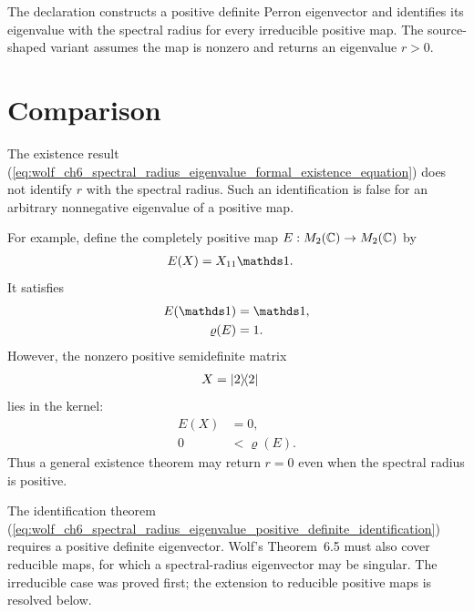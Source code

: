 \documentclass{article}
\begin{document}
The declaration
 constructs a positive
definite Perron eigenvector and identifies its eigenvalue with the spectral
radius for every irreducible positive map. The source-shaped variant
 assumes the
map is nonzero and returns an eigenvalue $r>0$.

\section{Comparison}

The existence result
(\ref{eq:wolf_ch6_spectral_radius_eigenvalue_formal_existence_equation}) does
not identify $r$ with the spectral radius. Such an identification is false
for an arbitrary nonnegative eigenvalue of a positive map.

For example, define the completely positive map $E:M_{2}(\mathbb{C})\to M_{2}(\mathbb{C})$ by
\begin{align}
    E(X)
        &=X_{11}\one.
    \label{eq:wolf_ch6_spectral_radius_eigenvalue_counterexample_map}
\end{align}
It satisfies
\begin{align}
    E(\one)
        &=\one,
    \label{eq:wolf_ch6_spectral_radius_eigenvalue_counterexample_unit_eigenvector}\\
    \varrho(E)
        &=1.
    \label{eq:wolf_ch6_spectral_radius_eigenvalue_counterexample_spectral_radius}
\end{align}
However, the nonzero positive semidefinite matrix
\begin{align}
    X
        &=|2\rangle\!\langle 2|
    \label{eq:wolf_ch6_spectral_radius_eigenvalue_counterexample_kernel_vector}
\end{align}
lies in the kernel:
\begin{align}
    E(X)
        &=0,
    \label{eq:wolf_ch6_spectral_radius_eigenvalue_counterexample_zero_eigenvalue}\\
    0
        &<\varrho(E).
    \label{eq:wolf_ch6_spectral_radius_eigenvalue_counterexample_strict_gap}
\end{align}
Thus a general existence theorem may return $r=0$ even when the spectral
radius is positive.

The identification theorem
(\ref{eq:wolf_ch6_spectral_radius_eigenvalue_positive_definite_identification})
requires a positive definite eigenvector. Wolf's Theorem~6.5
\cite{Wolf2012Quantum} must also cover reducible maps, for which a
spectral-radius eigenvector may be singular. The irreducible case was proved
first; the extension to reducible positive maps is resolved below.
\end{document}
